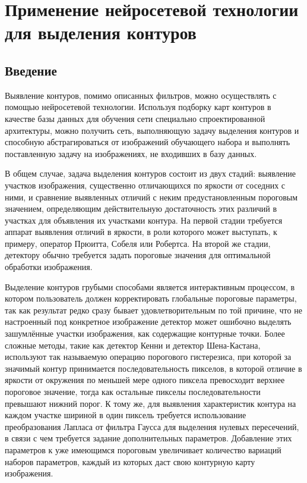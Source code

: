 \documentclass[a4paper,12pt]{report}
\begin{document}
\chapter{Применение нейросетевой технологии для выделения контуров}
\section{Введение}
Выявление контуров, помимо описанных фильтров, можно осуществлять с помощью нейросетевой технологии. Используя подборку карт контуров в качестве базы данных для обучения сети специально спроектированной архитектуры, можно получить сеть, выполняющую задачу выделения контуров и способную абстрагироваться от изображений обучающего набора и выполнять поставленную задачу на изображениях, не входивших в базу данных. 

В общем случае, задача выделения контуров состоит из двух стадий: выявление участков изображения, существенно отличающихся по яркости от соседних с ними, и сравнение выявленных отличий с неким предустановленным пороговым значением, определяющим действительную достаточность этих различий в участках для объявления их участками контура. На первой стадии требуется аппарат выявления отличий в яркости, в роли которого может выступать, к примеру, оператор Прюитта, Собеля или Робертса. На второй же стадии, детектору обычно требуется задать пороговые значения для оптимальной обработки изображения.
 
Выделение контуров грубыми способами является интерактивным процессом, в котором пользователь должен корректировать глобальные пороговые параметры, так как результат редко сразу бывает удовлетворительным по той причине, что не настроенный под конкретное изображение детектор может ошибочно выделять зашумлённые участки изображения, как содержащие контурные точки. Более сложные методы, такие как детектор Кенни и детектор Шена-Кастана, используют так называемую операцию порогового гистерезиса, при которой за значимый контур принимается последовательность пикселов, в которой отличие в яркости от окружения по меньшей мере одного пиксела превосходит верхнее пороговое значение, тогда как остальные пикселы последовательности превышают нижний порог.  К тому же, для выявления характеристик контура на каждом участке шириной в один пиксель требуется использование преобразования Лапласа от фильтра Гаусса для выделения нулевых пересечений, в связи с чем требуется задание дополнительных параметров. Добавление этих параметров к уже имеющимся пороговым увеличивает количество вариаций наборов параметров, каждый из которых даст свою контурную карту изображения.
\end{document}

